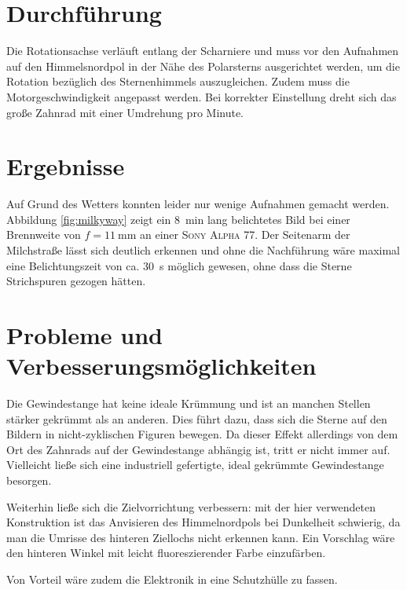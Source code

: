 \section{Durchführung}
Die Rotationsachse verläuft entlang der Scharniere und muss vor den Aufnahmen auf den Himmelsnordpol in der Nähe des Polarsterns ausgerichtet werden, um die Rotation bezüglich des Sternenhimmels auszugleichen. 
Zudem muss die Motorgeschwindigkeit angepasst werden. 
Bei korrekter Einstellung dreht sich das große Zahnrad mit einer Umdrehung pro Minute.

\section{Ergebnisse}
Auf Grund des Wetters konnten leider nur wenige Aufnahmen gemacht werden. 
Abbildung \ref{fig:milkyway} zeigt ein \SI{8}{\minute} lang belichtetes Bild bei einer Brennweite von $f=\SI{11}{\milli\meter}$ an einer \textsc{Sony Alpha 77}. 
Der Seitenarm der Milchstraße lässt sich deutlich erkennen und ohne die Nachführung wäre maximal eine Belichtungszeit von ca. \SI{30}{\second} möglich gewesen, ohne dass die Sterne Strichspuren gezogen hätten.

\section{Probleme und Verbesserungsmöglichkeiten}
Die Gewindestange hat keine ideale Krümmung und ist an manchen Stellen stärker gekrümmt als an anderen. 
Dies führt dazu, dass sich die Sterne auf den Bildern in nicht-zyklischen Figuren bewegen. 
Da dieser Effekt allerdings von dem Ort des Zahnrads auf der Gewindestange abhängig ist, tritt er nicht immer auf.
Vielleicht ließe sich eine industriell gefertigte, ideal gekrümmte Gewindestange besorgen.

Weiterhin ließe sich die Zielvorrichtung verbessern: mit der hier verwendeten Konstruktion ist das Anvisieren des Himmelnordpols bei Dunkelheit schwierig, da man die Umrisse des hinteren Ziellochs nicht erkennen kann. 
Ein Vorschlag wäre den hinteren Winkel mit leicht fluoreszierender Farbe einzufärben.

Von Vorteil wäre zudem die Elektronik in eine Schutzhülle zu fassen.


